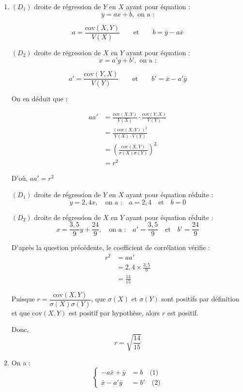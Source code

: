 \documentclass[12pt,a4paper]{article}
\begin{document}
\begin{enumerate}
\item \( (D_1) \) droite de régression de \( Y \) en \( X \) ayant pour équation : 
\[
y = ax + b, \text{ on a :}
\]

\[
a = \frac{\text{cov}(X, Y)}{V(X)} \qquad \text{et} \qquad b = \bar{y} - a\bar{x}
\]

\( (D_2) \) droite de régression de \( X \) en \( Y \) ayant pour équation : 
\[
x = a'y + b', \text{ on a :}
\]

\[
a' = \frac{\text{cov}(Y, X)}{V(Y)} 
\qquad \text{et} \qquad 
b' = \bar{x} - a'\bar{y}
\]

On en déduit que :

\[
\begin{aligned}
aa' &= \frac{\text{cov}(X, Y)}{V(X)} \cdot \frac{\text{cov}(Y, X)}{V(Y)} \\
    &= \frac{ \left( \text{cov}(X, Y) \right)^2 }{ V(X) \cdot V(Y) } \\
    &= \left( \frac{ \text{cov}(X, Y) }{ \sigma(X)\sigma(Y) } \right)^2 \\
    &= r^2
\end{aligned}
\]

D'où, \( \boxed{aa' = r^2} \)

\( (D_1) \) droite de régression de \( Y \) en \( X \) ayant pour équation réduite : 
\[
y = 2{,}4x, \quad \text{on a :} \quad a = 2{,}4 \quad \text{et} \quad b = 0
\]

\( (D_2) \) droite de régression de \( X \) en \( Y \) ayant pour équation réduite : 
\[
x = \frac{3{,}5}{9}y + \frac{24}{9}, \quad \text{on a :} \quad a' = \frac{3{,}5}{9} \quad \text{et} \quad b' = \frac{24}{9}
\]

D’après la question précédente, le coefficient de corrélation vérifie :
\[
\begin{aligned}
r^2 &= aa' \\
    &= 2{,}4 \times \frac{3{,}5}{9} \\
    &= \frac{14}{15}
\end{aligned}
\]

Puisque \( r = \dfrac{\text{cov}(X, Y)}{\sigma(X)\sigma(Y)} \), que \( \sigma(X) \) et \( \sigma(Y) \) sont positifs par définition et que \( \text{cov}(X, Y) \) est positif par hypothèse, alors \( r \) est positif.

Donc, \[
r = \sqrt{\dfrac{14}{15}}
\]
\item On a :
\[
\left\{
\begin{aligned}
- a\bar{x} + \bar{y} &= b \quad \text{(1)} \\
\bar{x} - a'\bar{y} &= b' \quad \text{(2)}
\end{aligned}
\right.
\]


\end{enumerate}
\end{document}

